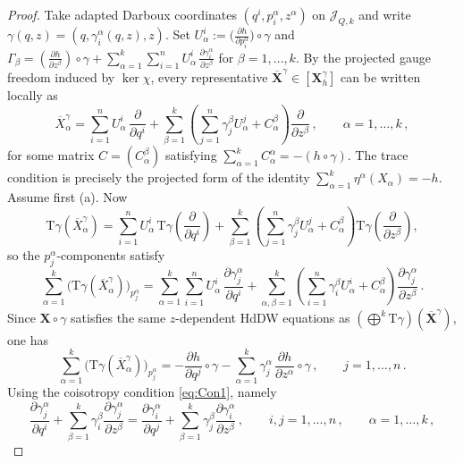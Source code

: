 \documentclass[11pt,twoside]{article}
\theoremstyle{plain}
\theoremstyle{definition}
\theoremstyle{remark}
\newcommand{\T}{\mathrm{T}}
\begin{document}
\begin{proof}
    Take adapted Darboux coordinates \((q^i,p_i^\alpha,z^\alpha)\) on \(\mathcal{J}_{Q,k}\) and write \(\gamma(q,z)=(q,\gamma_i^\alpha(q,z),z)\). Set \(U^i_\alpha:=\big(\frac{\partial h}{\partial p_i^\alpha}\big)\!\circ\gamma\) and \(\Gamma_\beta=\left(\frac{\partial h}{\partial z^\beta}\right)\!\circ\gamma+\sum_{\alpha=1}^k\sum_{i=1}^n U^i_\alpha\,\frac{\partial \gamma_i^\alpha}{\partial z^\beta}\) for $\beta=1,\dots,k$. By the projected gauge freedom induced by \(\ker\chi\), every representative \(\overline{\mathbf X}^{\gamma}\in[\mathbf X_h^\gamma]\) can be written locally as
    \[
        \overline X_\alpha^\gamma=\sum_{i=1}^n U^i_\alpha\,\frac{\partial}{\partial q^i}+\sum_{\beta=1}^k\left(\sum_{j=1}^n \gamma_j^\beta U^j_\alpha+C_\alpha^\beta\right)\frac{\partial}{\partial z^\beta}\,,\qquad \alpha=1,\dots,k\,,
    \]
    for some matrix \(C=(C_\alpha^\beta)\) satisfying \(\sum_{\alpha=1}^k C_\alpha^\alpha=-(h\circ\gamma)\). The trace condition is precisely the projected form of the identity \(\sum_{\alpha=1}^k\eta^\alpha({X}_\alpha)=-h\). Assume first (a). Now
    \[
        \T\gamma(\overline X_\alpha^\gamma)=\sum_{i=1}^n U^i_\alpha\,\T\gamma\!\left(\frac{\partial}{\partial q^i}\right)+\sum_{\beta=1}^k\left(\sum_{j=1}^n \gamma_j^\beta U^j_\alpha+C_\alpha^\beta\right)\T\gamma\!\left(\frac{\partial}{\partial z^\beta}\right),
    \]
    so the \(p_j^\alpha\)-components satisfy
    \begin{equation}\label{eq:First}
        \sum_{\alpha=1}^k\bigl(\T\gamma(\overline X_\alpha^\gamma)\bigr)_{p_j^\alpha}=\sum_{\alpha=1}^k\sum_{i=1}^n U^i_\alpha\,\frac{\partial \gamma_j^\alpha}{\partial q^i}+\sum_{\alpha,\beta=1}^k\left(\sum_{i=1}^n\gamma_i^\beta U^i_\alpha+C_\alpha^\beta\right)\frac{\partial \gamma_j^\alpha}{\partial z^\beta}\,. 
    \end{equation}
    Since \(\mathbf X\circ\gamma\) satisfies the same $z$-dependent HdDW equations as \((\bigoplus^k\T\gamma)(\overline{\mathbf X}^{\gamma})\), one has
    \begin{equation}\label{eq:Second}
        \sum_{\alpha=1}^k\bigl(\T\gamma(\overline X_\alpha^\gamma)\bigr)_{p_j^\alpha}=-\frac{\partial h}{\partial q^j}\!\circ\gamma-\sum_{\alpha=1}^k \gamma_j^\alpha\,\frac{\partial h}{\partial z^\alpha}\!\circ\gamma\,,\qquad j=1,\ldots,n\,.
    \end{equation}
    Using the coisotropy condition \eqref{eq:Con1}, namely
    \[
        \frac{\partial \gamma_{j}^{\alpha}}{\partial q^{i}}+\sum_{\beta=1}^k\gamma_{i}^{\beta}\frac{\partial \gamma_{j}^{\alpha}}{\partial z^{\beta}}=\frac{\partial \gamma_{i}^{\alpha}}{\partial q^{j}}+\sum_{\beta=1}^k\gamma_{j}^{\beta}\frac{\partial \gamma_{i}^{\alpha}}{\partial z^{\beta}}\,,\qquad i,j=1,\ldots,n\,,\qquad \alpha=1,\ldots,k\,,
\]
\end{proof}
\end{document}
